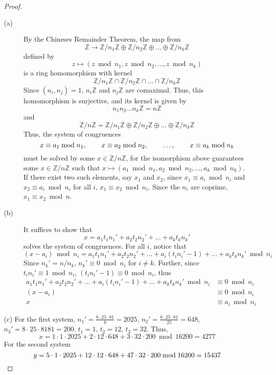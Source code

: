 \documentclass[12pt,leqno]{book}
\numberwithin{equation}{section}
\theoremstyle{definition}
\begin{document}
\begin{proof}
 \begin{description}
  \item [(a)] By the Chineses Remainder Theorem, the map from \[\mathbb{Z}\to\mathbb{Z}/n_1\mathbb{Z}\oplus\mathbb{Z}/n_2\mathbb{Z}\oplus\hdots\oplus\mathbb{Z}/n_k\mathbb{Z}\]defined by \[z\mapsto\left(z\bmod{n_1},z\bmod{n_2},\hdots,z\bmod{n_k}\right)\] is a ring homomorphism with kernel \[\mathbb{Z}/n_1\mathbb{Z}\cap\mathbb{Z}/n_2\mathbb{Z}\cap\hdots\cap\mathbb{Z}/n_k\mathbb{Z}\] Since $(n_i,n_j)=1$, $n_i\mathbb{Z}$ and $n_j\mathbb{Z}$ are comaximal. Thus, this homomorphism is surjective, and its kernel is given by \[n_1n_2\hdots n_k\mathbb{Z}=n\mathbb{Z}\] and \[\mathbb{Z}/n\mathbb{Z}=\mathbb{Z}/n_1\mathbb{Z}\oplus\mathbb{Z}/n_2\mathbb{Z}\oplus\hdots\oplus\mathbb{Z}/n_k\mathbb{Z}\] Thus, the system of congruences \[x\equiv a_1\bmod{n_1},\hskip.3in x\equiv a_2\bmod{n_2},\hskip.3in\hdots,\hskip.3in x\equiv a_k\bmod{n_k}\] must be solved by some $x\in\mathbb{Z}/n\mathbb{Z}$, for the isomorphism above guarantees some $x\in\mathbb{Z}/n\mathbb{Z}$ such that $x\mapsto(a_1\bmod{n_1},a_2\bmod{n_2},\hdots,a_k\bmod{n_k})$. If there exist two such elements, say $x_1$ and $x_2$, since $x_1\equiv a_i\bmod{n_i}$ and $x_2\equiv a_i\bmod{n_i}$ for all $i$, $x_1\equiv x_2\bmod{n_i}$. Since the $n_i$ are coprime, $x_1\equiv x_2\bmod{n}$.  
\item [(b)] It suffices to show that \[x=a_1t_1n_1'+a_2t_2n_2'+\hdots+a_kt_kn_k'\] solves the system of congruences. For all $i$, notice that \[(x-a_i)\bmod{n_i}=a_1t_1n_1'+a_2t_2n_2'+\hdots+a_i(t_in_i'-1)+\hdots+a_kt_kn_k'\bmod{n_i}\] Since $n_k'=n/n_k$, $n_k'\equiv0\bmod{n_i}$ for $i\not=k$. Further, since $t_in_i'\equiv1\bmod{n_i}$, $(t_in_i'-1)\equiv0\bmod{n_i}$, thus \begin{align*}a_1t_1n_1'+a_2t_2n_2'+\hdots+a_i(t_in_i'-1)+\hdots+a_kt_kn_k'\bmod{n_i}&\equiv0\bmod{n_i}\\(x-a_i)&\equiv0\bmod{n_i}\\x&\equiv a_i\bmod{n_i}\end{align*} 
 \end{description}
\item [(c)] For the first system, $n_1'=\frac{8\cdot25\cdot81}{8}=2025$, $n_2'=\frac{8\cdot25\cdot81}{25}=648$, $n_3'={8\cdot25\cdot81}{81}=200$. $t_1=1$, $t_2=12$, $t_3=32$. Thus, \[x=1\cdot1\cdot2025+2\cdot12\cdot648+3\cdot32\cdot200\bmod{16200}=4277\]
For the second system \[y=5\cdot1\cdot2025+12\cdot12\cdot648+47\cdot32\cdot200\bmod{16200}=15437\qedhere\]
\end{proof}
\end{document}
